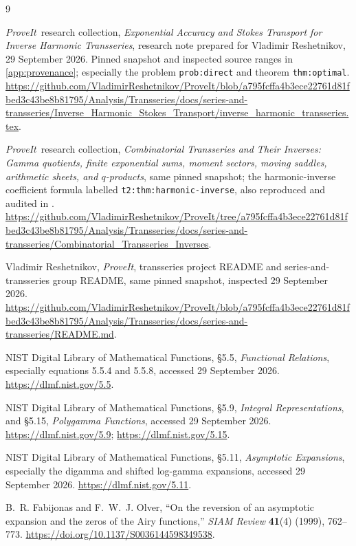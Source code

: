 \documentclass[11pt,a4paper]{article}
\theoremstyle{definition}
\numberwithin{equation}{section}
\newcommand{\repo}{\textit{ProveIt}}
\begin{document}
\clearpage
\begin{thebibliography}{9}

\repo\ research collection,
\emph{Exponential Accuracy and Stokes Transport for Inverse Harmonic
Transseries}, research note prepared for Vladimir Reshetnikov,
29 September 2026. Pinned snapshot and inspected source ranges in
\cref{app:provenance}; especially the problem \texttt{prob:direct} and
theorem \texttt{thm:optimal}.
\url{https://github.com/VladimirReshetnikov/ProveIt/blob/a795fcffa4b3ece22761d81fbed3c43be8b81795/Analysis/Transseries/docs/series-and-transseries/Inverse_Harmonic_Stokes_Transport/inverse_harmonic_transseries.tex}.

\repo\ research collection,
\emph{Combinatorial Transseries and Their Inverses: Gamma quotients,
finite exponential sums, moment sectors, moving saddles, arithmetic
sheets, and $q$-products}, same pinned snapshot; the harmonic-inverse
coefficient formula labelled \texttt{t2:thm:harmonic-inverse}, also reproduced
and audited in \cite{prior}.
\url{https://github.com/VladimirReshetnikov/ProveIt/tree/a795fcffa4b3ece22761d81fbed3c43be8b81795/Analysis/Transseries/docs/series-and-transseries/Combinatorial_Transseries_Inverses}.

Vladimir Reshetnikov, \emph{ProveIt}, transseries project README and
series-and-transseries group README, same pinned snapshot, inspected
29 September 2026.
\url{https://github.com/VladimirReshetnikov/ProveIt/blob/a795fcffa4b3ece22761d81fbed3c43be8b81795/Analysis/Transseries/docs/series-and-transseries/README.md}.

NIST Digital Library of Mathematical Functions,
\S5.5, \emph{Functional Relations}, especially equations 5.5.4 and 5.5.8,
accessed 29 September 2026.
\url{https://dlmf.nist.gov/5.5}.

NIST Digital Library of Mathematical Functions,
\S5.9, \emph{Integral Representations}, and \S5.15,
\emph{Polygamma Functions}, accessed 29 September 2026.
\url{https://dlmf.nist.gov/5.9}; \url{https://dlmf.nist.gov/5.15}.

NIST Digital Library of Mathematical Functions,
\S5.11, \emph{Asymptotic Expansions}, especially the digamma and shifted
log-gamma expansions, accessed 29 September 2026.
\url{https://dlmf.nist.gov/5.11}.

B.~R. Fabijonas and F.~W.~J. Olver,
``On the reversion of an asymptotic expansion and the zeros of the Airy
functions,'' \emph{SIAM Review} \textbf{41}(4) (1999), 762--773.
\url{https://doi.org/10.1137/S0036144598349538}.


\end{thebibliography}
\end{document}
